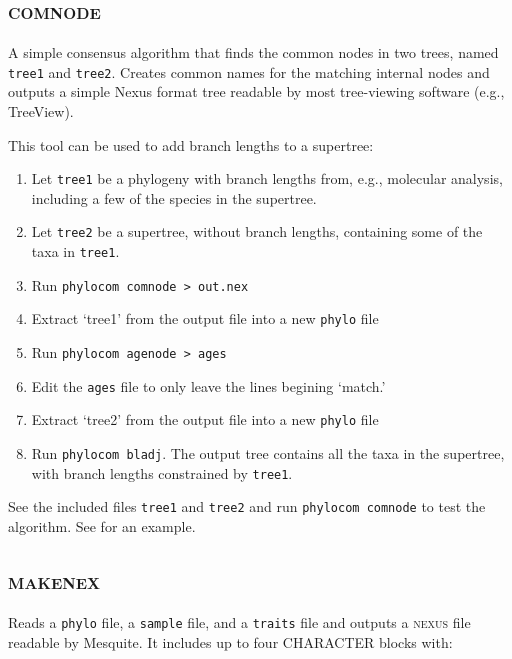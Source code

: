 \documentclass[12pt,letterpaper]{article}
\begin{document}
\subsection{\scshape comnode}

A simple consensus algorithm that finds the common nodes in two trees,
named \verb|tree1| and \verb|tree2|. Creates common names for the
matching internal nodes and outputs a simple Nexus format tree
readable by most tree-viewing software (e.g., TreeView). 

This tool can be used to add branch lengths to a supertree: 

\begin{enumerate}
\item Let \verb|tree1| be a phylogeny with branch lengths from, e.g., 
  molecular analysis, including a few of the species in the supertree.
\item Let \verb|tree2| be a supertree, without branch lengths,
  containing some of the taxa in \verb|tree1|.
\item Run \verb|phylocom comnode > out.nex|
\item Extract `tree1' from the output file into a new \verb|phylo| file
\item Run \verb|phylocom agenode > ages|
\item Edit the \verb|ages| file to only leave the lines begining
  `match.'
\item Extract `tree2' from the output file into a new \verb|phylo|
  file
\item Run \verb|phylocom bladj|. The output tree contains all the taxa
  in the supertree, with branch lengths constrained by \verb|tree1|.
\end{enumerate}

See the included files \verb|tree1| and \verb|tree2| and run
\verb|phylocom comnode| to test the algorithm.  See
\citet{strauss2006exo} for an example.

\subsection{\scshape makenex}

Reads a \verb|phylo| file, a \verb|sample| file, and a \verb|traits|
file and outputs a {\scshape nexus} file readable by Mesquite. It
includes up to four CHARACTER blocks with:
\end{document}

